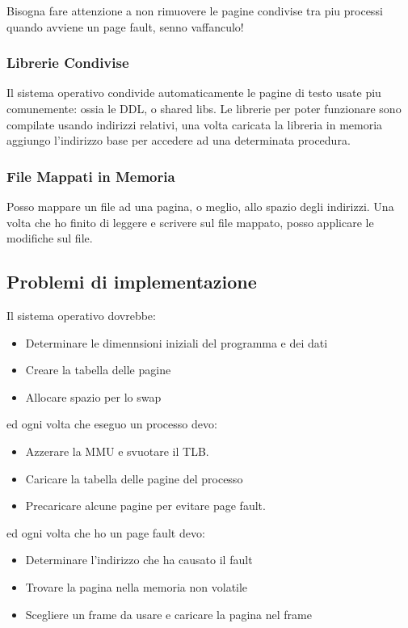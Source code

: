 Bisogna fare attenzione a non rimuovere le pagine condivise tra piu processi quando avviene un page fault, senno vaffanculo!

\subsubsection{Librerie Condivise}
Il sistema operativo condivide automaticamente le pagine di testo usate piu comunemente: ossia le DDL, o shared libs.
Le librerie per poter funzionare sono compilate usando indirizzi relativi, una volta caricata la libreria in memoria
aggiungo l'indirizzo base per accedere ad una determinata procedura.

\subsubsection{File Mappati in Memoria}
Posso mappare un file ad una pagina, o meglio, allo spazio degli indirizzi. Una volta che ho finito di
leggere e scrivere sul file mappato, posso applicare le modifiche sul file.

\subsection{Problemi di implementazione}
Il sistema operativo dovrebbe:
\begin{itemize}
    \item Determinare le dimennsioni iniziali del programma e dei dati
    \item Creare la tabella delle pagine
    \item Allocare spazio per lo swap
\end{itemize}

ed ogni volta che eseguo un processo devo:
\begin{itemize}
    \item Azzerare la MMU e svuotare il TLB.
    \item Caricare la tabella delle pagine del processo
    \item Precaricare alcune pagine per evitare page fault.
\end{itemize}

ed ogni volta che ho un page fault devo:
\begin{itemize}
    \item Determinare l'indirizzo che ha causato il fault
    \item Trovare la pagina nella memoria non volatile
    \item Scegliere un frame da usare e caricare la pagina nel frame
\end{itemize}

